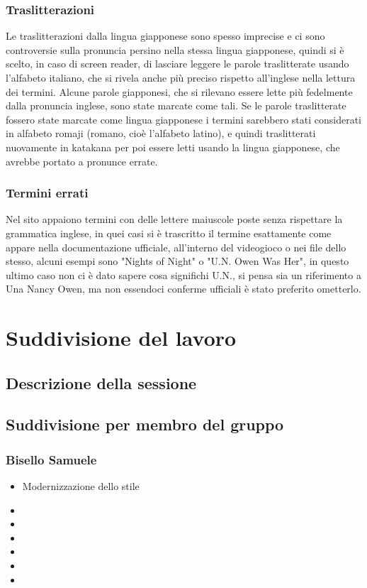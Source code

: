 \documentclass[openany, a4paper, 12pt]{report}
\begin{document}
			\subsection{Traslitterazioni}
				Le traslitterazioni dalla lingua giapponese sono spesso imprecise e ci sono controversie sulla pronuncia persino nella stessa lingua giapponese, quindi si è scelto, in caso di screen reader, di lasciare leggere le parole traslitterate usando l'alfabeto italiano, che si rivela anche più preciso rispetto all'inglese nella lettura dei termini.
				Alcune parole giapponesi, che si rilevano essere lette più fedelmente dalla pronuncia inglese, sono state marcate come tali.
				Se le parole traslitterate fossero state marcate come lingua giapponese i termini sarebbero stati considerati in alfabeto romaji (romano, cioè l'alfabeto latino), e quindi traslitterati nuovamente in katakana per poi essere letti usando la lingua giapponese, che avrebbe portato a pronunce errate.
			\subsection{Termini errati}
				Nel sito appaiono termini con delle lettere maiuscole poste senza rispettare la grammatica inglese, in quei casi si è trascritto il termine esattamente come appare nella documentazione ufficiale, all'interno del videogioco o nei file dello stesso, alcuni esempi sono "Nights of Night" o "U.N. Owen Was Her", in questo ultimo caso non ci è dato sapere cosa significhi U.N., si pensa sia un riferimento a Una Nancy Owen, ma non essendoci conferme ufficiali è stato preferito ometterlo.\\
			
	\chapter{Suddivisione del lavoro}
	\section{Descrizione della sessione}
	\section{Suddivisione per membro del gruppo}
	\subsection{Bisello Samuele}
	\begin{itemize}
		\item Modernizzazione dello stile
		\item 
		\item 
		\item 
		\item 
		\item 
		\item 
	\end{itemize}
\end{document}
